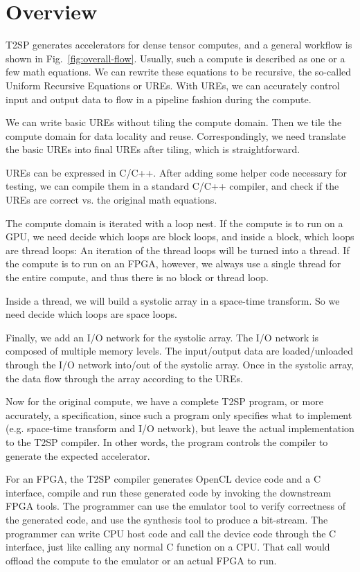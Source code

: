 \chapter{Overview}

T2SP generates accelerators for dense tensor computes, and a general workflow is shown in Fig.~\ref{fig:overall-flow}. Usually, such a compute is described as one or a few math equations.  We can rewrite these equations to be recursive, the so-called Uniform Recursive Equations or UREs. With UREs, we can accurately control input and output data to flow in a pipeline fashion during the compute.

We can write basic UREs without tiling the compute domain. Then we tile the compute domain for data locality and reuse. Correspondingly, we need translate the basic UREs into final UREs after tiling, which is straightforward.

UREs can be expressed in C/C++. After adding some helper code necessary for testing,  we can compile them in a standard C/C++ compiler, and check if the UREs are correct vs. the original math equations.

The compute domain is iterated with a loop nest. If the compute is to run on a GPU, we need decide which loops are block loops, and inside a block, which loops are thread loops: An iteration of the thread loops will be turned into a thread. If the compute is to run on an FPGA, however, we always use a single thread for the entire compute, and thus there is no block or thread loop. 

Inside a thread, we will build a systolic array in a space-time transform. So we need decide which loops are space loops.  

Finally, we add an I/O network for the systolic array.  The I/O network is composed of multiple memory levels. The input/output data are loaded/unloaded through the I/O network into/out of the systolic array. Once in the systolic array, the data flow through the array according to the UREs.  

Now for the original compute, we have a complete T2SP program, or more accurately, a specification, since such a program only specifies what to implement (e.g. space-time transform and I/O network), but leave the actual implementation to the T2SP compiler. In other words, the program controls the compiler to generate the expected accelerator. 

For an FPGA, the T2SP compiler generates OpenCL device code and a C interface, compile and run these generated code by invoking the downstream FPGA tools. The programmer can use the emulator tool to verify correctness of the generated code, and use the synthesis tool to produce a bit-stream.  The programmer can write CPU host code and call the device code through the C interface, just like calling any normal C function on a CPU. That call would offload the compute to the emulator or an actual FPGA to run.

